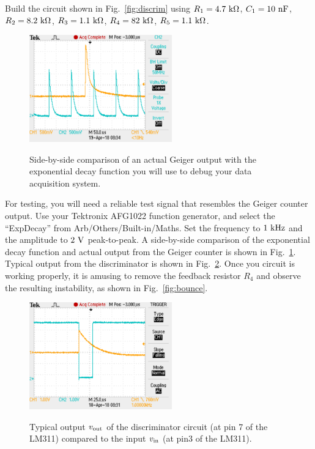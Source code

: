\documentclass[12pt]{article}
\begin{document}
Build the circuit shown in Fig.~\ref{fig:discrim} using $R_1=4.7~{\rm k\Omega}$, $C_1=10~{\rm nF}$,
$R_2=8.2~{\rm k\Omega}$, $R_3=1.1~{\rm k\Omega}$, $R_4=82~{\rm k\Omega}$, $R_5=1.1~{\rm k\Omega}$.  

\begin{figure}[htbp]
\begin{center}
{\includegraphics[width=0.55\textwidth]{figs/fake.pdf}}
\end{center}
\caption{\label{fig:fake} Side-by-side comparison of an actual Geiger output with the exponential decay function you will use to debug your data acquisition system.}
\end{figure}

For testing, you will need a reliable test signal that resembles the Geiger counter output.  Use your Tektronix AFG1022 function generator, and select the ``ExpDecay'' from Arb/Others/Built-in/Maths.
Set the frequency to $1~\rm kHz$ and the amplitude to $2~\rm V$ peak-to-peak.  A side-by-side comparison of the exponential decay function and actual output from the Geiger counter is shown in Fig.~\ref{fig:fake}.  Typical output from the discriminator is shown in Fig.~\ref{fig:typout}.  Once you circuit is working properly, it is amusing to remove the feedback resistor $R_4$ and observe the resulting instability, as shown in Fig.~\ref{fig:bounce}.

\begin{figure}[htbp]
\begin{center}
{\includegraphics[width=0.55\textwidth]{figs/discrim.pdf}}
\end{center}
\caption{\label{fig:typout} Typical output $v_{\rm out}$ of the discriminator circuit (at pin 7 of the LM311) compared to the input $v_{\rm in}$ (at pin3 of the LM311).}
\end{figure}
\end{document}
